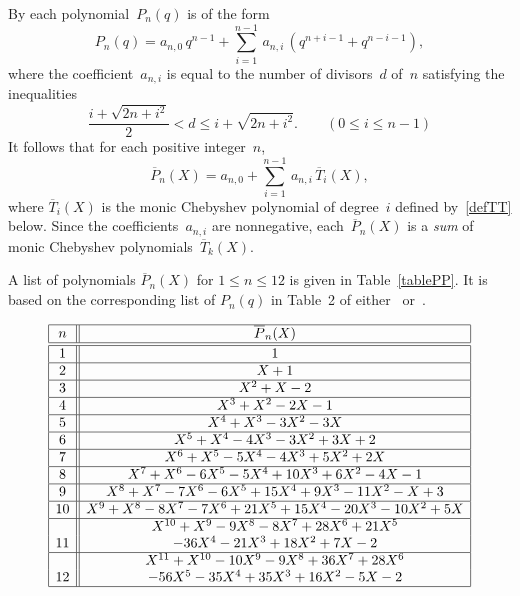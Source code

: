 \documentclass[11pt, a4paper]{amsart}
\theoremstyle{definition}
\newcommand\Pg{\overline{P}}
\newcommand\TT{\overline{T}}
\numberwithin{equation}{section}
\begin{document}
By \cite[Thm.~1.3]{KR3} each polynomial~$P_n(q)$ is of the form
\begin{equation*}\label{Pn-coeff}
P_n(q) = a_{n,0}\, q^{n-1}  + \sum_{i=1}^{n-1} \, a_{n,i} \, \left( q^{n+i-1} + q^{n-i-1} \right) , 
\end{equation*}
where the coefficient~$a_{n,i}$ is equal to the number of divisors~$d$ of~$n$ satisfying the inequalities
\begin{equation}\label{Pn-coeff}
\frac{i+ \sqrt{2n+i^2}}{{2}} < d \leq i+ \sqrt{2n+i^2} . \qquad (0 \leq i \leq n-1)
\end{equation}
It follows that for each positive integer~$n$,
\begin{equation}\label{PPTT}
\Pg_n(X) = a_{n,0}  + \sum_{i=1}^{n-1} \, a_{n,i} \, \TT_i(X) ,
\end{equation}
where $\TT_i(X)$ is the monic Chebyshev polynomial of degree~$i$ defined by~\eqref{defTT} below.
Since the coefficients~$a_{n,i}$ are nonnegative, each~$\Pg_n(X)$ is a \emph{sum} of monic Chebyshev polynomials~$\TT_k(X)$.

A list of polynomials $\Pg_n(X)$ for $1 \leq n \leq 12$ is given in Table~\ref{tablePP}.
It is based on the corresponding list of $P_n(q)$ in Table~2 of either~\cite{KR2} or~\cite{KR3}.

\begin{table}[ht]
\caption{\emph{The polynomials $\Pg_n (X)$}}\label{tablePP}
\renewcommand\arraystretch{1.25}
\noindent\[
\begin{array}{|c||c|}
\hline
n & \Pg_n(X) \\
\hline\hline
1 & 1   \\ 
\hline
2 & X + 1  \\
\hline
3 & X^2 + X - 2  \\ 
\hline
4 & X^3 + X^2 - 2X -1  \\ 
\hline
5 & X^4 + X^3 - 3 X^2 - 3X  \\ 
\hline
6 &  X^5 + X^4 - 4X^3 - 3 X^2 + 3X + 2   \\
\hline
7 & X^6 + X^5 - 5 X^4 -4 X^3 + 5X^2 + 2X  \\ 
\hline
8 &  X^7 +X^6 - 6X^5 - 5 X^4 + 10 X^3 + 6 X^2 - 4X -1  \\ 
\hline
9 &  X^8 + X^7 - 7 X^6 - 6 X^5 +15 X^4 + 9 X^3 - 11 X^2 - X +3  \\
\hline
10 & X^9 + X^8 -8 X^7 -7 X^6 + 21 X^5  + 15 X^4 - 20 X^3 - 10 X^2 + 5X   \\
\hline
&  X^{10} + X^9 - 9 X^8 - 8 X^7 + 28 X^6 + 21 X^5  \\
11 &   - 36 X^4 - 21 X^3 + 18 X^2 + 7X - 2  \\
\hline
&   X^{11} + X^{10} - 10 X^9 - 9 X^8 + 36 X^7 + 28 X^6  \\
12 & - 56 X^5 -35 X^4 + 35 X^3 + 16 X^2 - 5 X  -2  \\
\hline
\end{array}
\]
\end{table}
\end{document}
